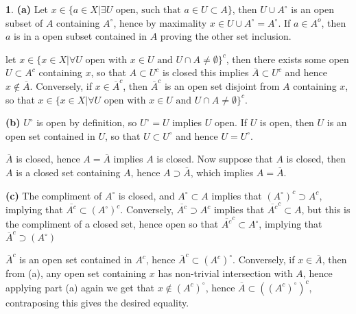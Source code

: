 \documentclass[10.5pt]{article}
\theoremstyle{definition}
\newtheorem{pb}{}
\newcommand{\set}[1]{\{#1\}}
\newcommand{\tand}[1]{\text{ and }}
\begin{document}
    \begin{pb}
        \textbf{(a)} Let \(x \in \set{a\in X \vert \exists U \text{ open, such that } a \in U \subset A}\), then \(U \cup A^\circ\) is an open subset of \(A\) containing \(A^\circ\),
        hence by maximality \(x \in U \cup A^\circ = A^\circ\). If \(a \in A^o\), then \(a\) is in a open subset contained in \(A\) proving the other set inclusion.

        let \(x \in \set{x \in X \vert \forall U \text{ open with } x \in U \tand UU \cap A \neq \emptyset}^c\), then there exists some open \(U \subset A^c\) containing \(x\),
        so that \(A \subset U^c\) is closed this implies \(\overline{A} \subset U^c\) and hence \(x \not \in \overline{A}\). Conversely, if \(x \in \overline{A}^c\), then
        \(\overline{A}^c\) is an open set disjoint from \(A\) containing \(x\), so that \(x \in \set{x \in X \vert \forall U \text{ open with } x \in U \tand UU \cap A \neq \emptyset}^c\).

        \textbf{(b)} \(U^\circ\) is open by definition, so \(U^\circ = U\) implies \(U\) open. If \(U\) is open, then \(U\) is an open set contained in \(U\), so that \(U \subset U^\circ\) 
        and hence \(U = U^\circ\).

        \(\overline{A}\) is closed, hence \(A = \overline{A}\) implies \(A\) is closed. Now suppose that \(A\) is closed, then \(A\) is a closed set containing \(A\), hence
        \(A \supset \overline{A}\), which implies \(A = \overline{A}\).

        \textbf{(c)} The compliment of \(A^\circ\) is closed, and \(A^\circ \subset A\) implies that \(\left(A^\circ\right)^c \supset A^c\), implying that
        \(\overline{A^c} \subset \left(A^\circ\right)^c\). Conversely, \(\overline{A^c} \supset A^c\) implies that \(\overline{A^c}^c \subset A\), but this
        is the compliment of a closed set, hence open so that \(\overline{A^c}^c \subset A^\circ\), implying that \(\overline{A}^c \supset \left(A^\circ\right)\)

        \(\overline{A}^c\) is an open set contained in \(A^c\), hence \(\overline{A}^c \subset (A^c)^\circ\). Conversely, if \(x \in \overline{A}\), then from (a), any open set containing
        \(x\) has non-trivial intersection with \(A\), hence applying part (a) again we get that \(x \not \in (A^c)^\circ\), hence \(\overline{A} \subset \left((A^c)^\circ\right)^c\),
        contraposing this gives the desired equality.
    \end{pb}
\end{document}
